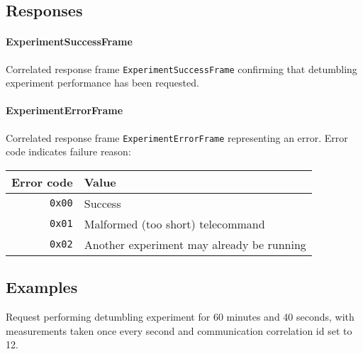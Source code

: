 \begin{tcarglist}
\end{tcarglist}

\subsection{Responses}
\paragraph{ExperimentSuccessFrame}

Correlated response frame \texttt{ExperimentSuccessFrame} confirming 
that detumbling experiment performance has been requested.

\paragraph{ExperimentErrorFrame}
Correlated response frame \texttt{ExperimentErrorFrame} representing an error. 
Error code indicates failure reason:

\begin{tabular}{r | l}
    Error code & Value \\
    \hline
    \texttt{0x00}   & Success \\
    \texttt{0x01}   & Malformed (too short) telecommand \\
    \texttt{0x02}   & Another experiment may already be running \\
\end{tabular}

\subsection{Examples}
Request performing detumbling experiment for 60 minutes and 40 seconds, with measurements taken once every second and communication correlation id set to 12.

